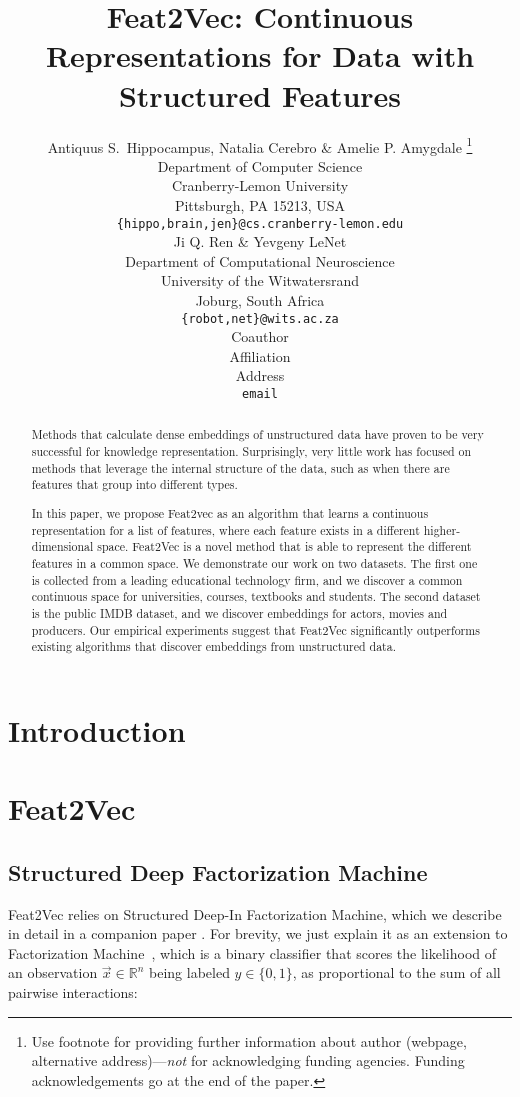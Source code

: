 \documentclass{article} %
\title{Feat2Vec: Continuous Representations for Data with Structured Features}
\author{Antiquus S.~Hippocampus, Natalia Cerebro \& Amelie P. Amygdale \thanks{ Use footnote for providing further information
about author (webpage, alternative address)---\emph{not} for acknowledging
funding agencies.  Funding acknowledgements go at the end of the paper.} \\
Department of Computer Science\\
Cranberry-Lemon University\\
Pittsburgh, PA 15213, USA \\
\texttt{\{hippo,brain,jen\}@cs.cranberry-lemon.edu} \\
\And
Ji Q. Ren \& Yevgeny LeNet \\
Department of Computational Neuroscience \\
University of the Witwatersrand \\
Joburg, South Africa \\
\texttt{\{robot,net\}@wits.ac.za} \\
\AND
Coauthor \\
Affiliation \\
Address \\
\texttt{email}
}
\newcommand{\vect}[1]{\vec{#1}}
\renewcommand{\cite}[1]{\citep{#1}}
\begin{document}
\maketitle

\begin{abstract}
Methods that calculate dense embeddings of unstructured data have proven to be very successful for knowledge representation.
Surprisingly, very little work has focused on methods that leverage the internal structure of the data, such as when there are features that  group into different types.

In this paper, we propose Feat2vec as an algorithm that learns a continuous representation for a list of features, where each feature exists in a different higher-dimensional space. 
Feat2Vec is a novel method that is able  to represent the different features in a common space. 
We demonstrate our work on two datasets.  
The first one is collected from a leading educational technology firm, and we discover a common continuous space for universities, courses, textbooks and students.  
The second dataset is the public IMDB dataset, and we discover embeddings for actors, movies and producers. 
Our empirical experiments suggest that Feat2Vec significantly outperforms existing algorithms that discover embeddings from unstructured data.
 
\end{abstract}

\section{Introduction}

\section{Feat2Vec}
\subsection{Structured Deep Factorization Machine}

Feat2Vec relies on Structured Deep-In Factorization Machine, which we describe in detail in a companion paper \cite{deepfm}.
For brevity, we just explain it as an extension to Factorization Machine~\cite{rendle2010factorization}, which is a binary classifier that scores the likelihood of an observation $\vect{x} \in \mathbb{R}^n$ being labeled  $y \in \{0,1\}$, as proportional to the sum of all pairwise interactions:
\end{document}
